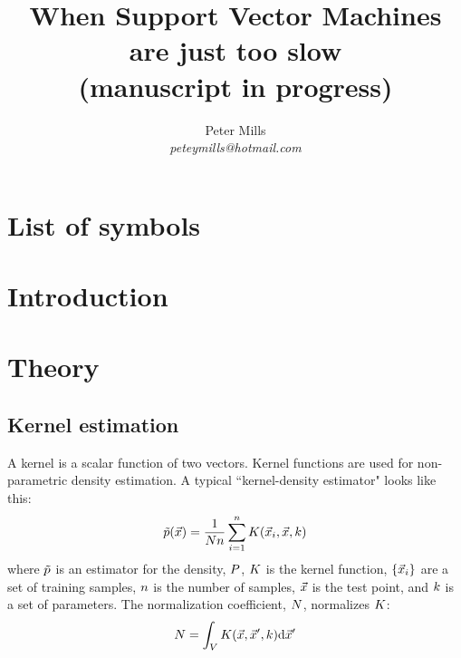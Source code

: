 \documentclass[11pt]{article}
\begin{document}
\title{When Support Vector Machines are just too slow\\(manuscript in progress)}

\author{Peter Mills\\\textit{peteymills@hotmail.com}}

\maketitle



\tableofcontents

\section*{List of symbols}



\section{Introduction}

\section{Theory}

\subsection{Kernel estimation}

A kernel is a scalar function of two vectors. Kernel functions are used for 
non-parametric density estimation. A typical ``kernel-density estimator"
looks like this:
\begin{equation}
	\tilde p(\vec {x}) = \frac {1}{N n} \sum_{i=1}^n K(\vec {x}_i, \vec {x}, k)
	\label{kernel_estimator}
\end{equation}
where $\tilde p$ is an estimator for the density, $P$, 
$K$ is the kernel function,
$\lbrace \vec {x}_i \rbrace$ are a set of training samples, 
$n$ is the number of samples,
$\vec {x}$ is the test point,
and $k$ is a set of parameters. 
The normalization coefficient, $N$, normalizes $K$:
\begin{equation}
	N = \int_V K(\vec {x}, \vec {x}^\prime, k) \mathrm d \vec {x}^\prime
	\label{norm_def}
\end{equation}
\end{document}
